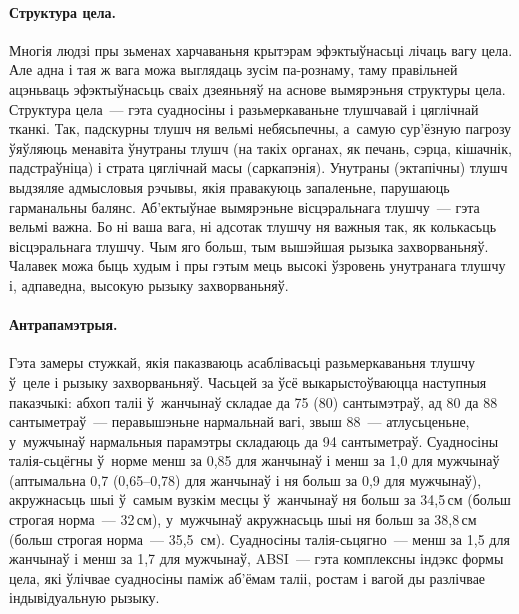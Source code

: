 \paragraph{Структура цела.}
Многія людзі пры зьменах харчаваньня крытэрам эфэктыўнасьці лічаць вагу цела. Але адна і тая ж вага можа выглядаць зусім па-рознаму, таму правільней ацэньваць эфэктыўнасьць сваіх дзеяньняў на аснове вымярэньня структуры цела. Структура цела~--- гэта суадносіны і разьмеркаваньне тлушчавай і цяглічнай тканкі. Так, падскурны тлушч ня вельмі небясьпечны, а~самую сур'ёзную пагрозу ўяўляюць менавіта ўнутраны тлушч (на такіх органах, як печань, сэрца, кішачнік, падстраўніца) і страта цяглічнай масы (саркапэнія). Унутраны (эктапічны) тлушч выдзяляе адмысловыя рэчывы, якія правакуюць запаленьне, парушаюць гарманальны балянс. Аб'ектыўнае вымярэньне вісцэральнага тлушчу~--- гэта вельмі важна. Бо ні ваша вага, ні адсотак тлушчу ня важныя так, як колькасьць вісцэральнага тлушчу. Чым яго больш, тым вышэйшая рызыка захворваньняў. Чалавек можа быць худым і пры гэтым мець высокі ўзровень унутранага тлушчу і, адпаведна, высокую рызыку захворваньняў.


\paragraph{Антрапамэтрыя.}
Гэта замеры стужкай, якія паказваюць асаблівасьці разьмеркаваньня тлушчу ў~целе і рызыку захворваньняў. Часьцей за ўсё выкарыстоўваюцца наступныя паказчыкі: абхоп таліі ў~жанчынаў складае да 75 (80) сантымэтраў, ад 80 да 88 сантыметраў~--- перавышэньне нармальнай вагі, звыш 88~--- атлусьценьне, у~мужчынаў нармальныя парамэтры складаюць да 94 сантыметраў. Суадносіны талія-сьцёгны ў~норме менш за 0,85 для жанчынаў і менш за 1,0 для мужчынаў (аптымальна 0,7 (0,65--0,78) для жанчынаў і ня больш за 0,9 для мужчынаў), акружнасьць шыі ў~самым вузкім месцы ў~жанчынаў ня больш за 34,5\,см (больш строгая норма~--- 32\,см), у~мужчынаў акружнасьць шыі ня больш за 38,8\,см (больш строгая норма~--- 35,5~см). Суадносіны талія-сьцягно~--- менш за 1,5 для жанчынаў і менш за 1,7 для мужчынаў, ABSI~--- гэта комплексны індэкс формы цела, які ўлічвае суадносіны паміж аб'ёмам таліі, ростам і вагой ды разлічвае індывідуальную рызыку.

